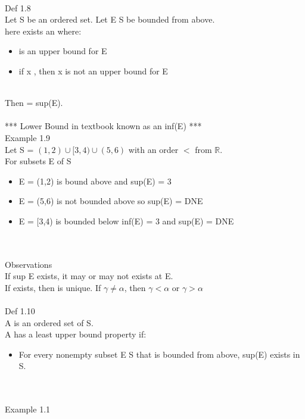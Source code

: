 \hfill \\
Def 1.8 \\
Let S be an ordered set. Let E \subset S be bounded from above. \\
here exists an \alpha where:
\begin{itemize}
	\item \alpha is an upper bound for E
	\item if x \< \alpha, then x is not an upper bound for E
\end{itemize} \\
Then \alpha = sup(E). \\

\hfill \\
*** Lower Bound in textbook known as an inf(E) *** \\
Example 1.9 \\
Let S = $ (1,2) \cup [3,4) \cup (5,6) $ with an order $ < $ from $ \mathbb{R} $. \\
For subsets E of S \\
\begin{itemize}
	\item E = (1,2) is bound above and sup(E) = 3
	\item E = (5,6) is not bounded above so sup(E) = DNE
	\item E = [3,4) is bounded below inf(E) = 3 and sup(E) = DNE
\end{itemize} \\

\hfill \\
Observations \\
If sup E exists, it may or may not exists at E. \\
If \alpha exists, then \alpha is unique.
If $ \gamma \neq \alpha $, then $ \gamma < \alpha $ or $ \gamma > \alpha $ \\

\hfill \\
Def 1.10 \\
A is an ordered set of S. \\
A has a least upper bound property if:
\begin{itemize}
	\item For every nonempty subset E \subset S that is bounded from above, sup(E) exists in S.
\end{itemize} \\

\hill \\
Example 1.1 \\












